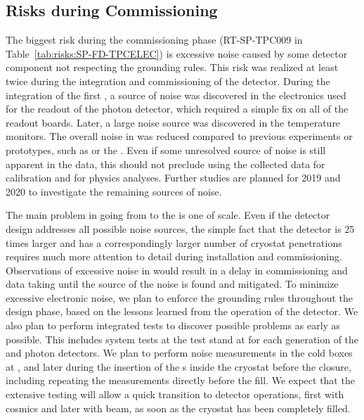 \subsection{Risks during Commissioning}
\label{sec:fdsp-tpcelec-risks-commissioning}

The biggest risk during the commissioning phase
(RT-SP-TPC009 in Table~\ref{tab:risks:SP-FD-TPCELEC}) is excessive noise 
caused by some detector component not respecting the  grounding
rules. This risk was realized at least twice during the 
integration and commissioning of the  detector. During the 
integration of the first , a source of noise was discovered 
in the electronics used for the readout of the photon  detector, which 
required a simple fix on all of the readout boards. Later, a large noise source was 
discovered in the temperature monitors. The overall noise in  
was reduced compared to previous  experiments or prototypes, 
such as  or the . Even if some unresolved source of noise 
is still apparent in the  data, this should not preclude using the
collected data for calibration and for physics analyses. Further studies are
planned for 2019 and 2020 to investigate the remaining sources of noise.

The main problem in going from  to the   is one of scale.
Even if the detector design addresses all possible noise sources, the simple
fact that the detector is 25 times larger and has a correspondingly larger
number of cryostat penetrations requires much more attention to detail
during installation and commissioning. Observations of excessive 
noise in  would result in a delay in commissioning and  
data taking until the source of the noise is found and mitigated. To minimize excessive 
electronic noise, we plan to enforce the grounding  rules throughout the 
design phase, based on the lessons learned from the operation of the 
 detector. We also plan to perform  integrated tests to discover 
possible problems as early as possible. This includes system tests at the  test stand at  for each generation 
of the  and photon detectors. We plan to perform noise 
measurements in the cold boxes at , and later 
during the insertion of the s inside the cryostat before the 
 closure, including repeating the measurements directly before the  fill. 
We expect that the extensive testing will allow a quick transition to 
detector operations, first with cosmics and later with beam, as soon as the 
cryostat has been completely filled. 

